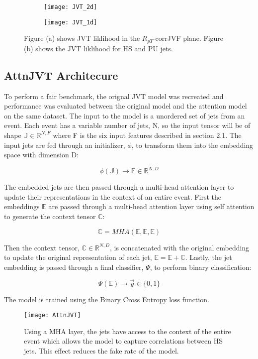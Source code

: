 \begin{figure}[h!]
\centering
\begin{subfigure}{.3\textwidth}
  \centering
  \texttt{[image: JVT\_2d]}
  \caption{}
  \label{fig:sub1}
\end{subfigure}%
\begin{subfigure}{.3\textwidth}
  \centering
  \texttt{[image: JVT\_1d]}
  \caption{}
  \label{fig:sub2}
\end{subfigure}
\caption{Figure (a) shows JVT liklihood in the $R_{pT}$-corrJVF plane. Figure (b) shows the JVT liklihood for HS and PU jets.}
\label{fig:test}
\end{figure}

\subsection{AttnJVT Architecure}\hfill

To perform a fair benchmark, the orignal JVT model was recreated and performance was evaluated between the original model and the attention model on the same dataset. The input to the model is a unordered set of jets from an event. Each event has a variable number of jets, N, so the input tensor will be of shape $\mathbb{J} \in \mathbb{R}^{N,F}$ where F is the six input features described in section 2.1. The input jets are fed through an initializer, $\phi$, to transform them into the embedding space with dimension D:

\begin{equation}
\phi(\mathbb{J}) \rightarrow \mathbb{E} \in \mathbb{R}^{N,D} 
\end{equation}

The embedded jets are then passed through a multi-head attention layer to update their representations in the context of an entire event. First the embeddings $\mathbb{E}$ are passed through a multi-head attention layer using self attention to generate the context tensor $\mathbb{C}$:

\begin{equation}
\mathbb{C} = MHA(\mathbb{E},\mathbb{E},\mathbb{E})
\end{equation}

Then the context tensor, $\mathbb{C} \in \mathbb{R}^{N,D}$, is concatenated with the original embedding to update the original representation of each jet, $\mathbb{E} = \mathbb{E}+\mathbb{C}$. Lastly, the jet embedding is passed through a final classifier, $\Psi$, to perform binary classification:

\begin{equation}
\Psi(\mathbb{E}) \rightarrow \vec{y} \in \{0,1\}
\end{equation}

The model is trained using the Binary Cross Entropy loss function.

\begin{figure}[h!]
\centering
\texttt{[image: AttnJVT]}
\caption{Using a MHA layer, the jets have access to the context of the entire event which allows the model to capture correlations between HS jets. This effect reduces the fake rate of the model.}
\label{fig:test}
\end{figure}
